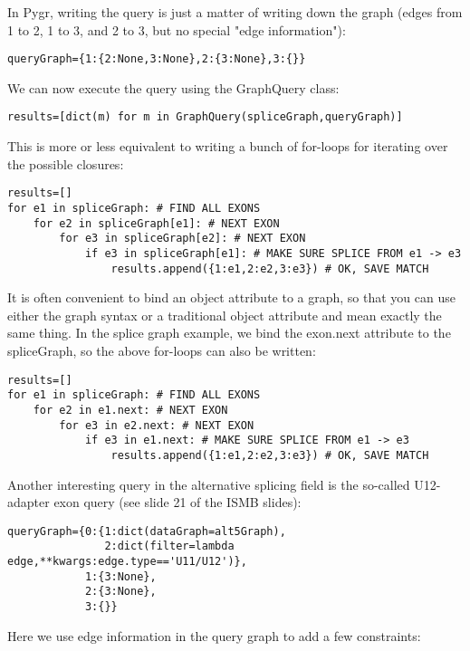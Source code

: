 \documentclass{howto}
\begin{document}
In Pygr, writing the query is just a matter of writing down the graph (edges from 1 to 2, 1 to 3, and 2 to 3, but no special "edge information"):

\begin{verbatim}
queryGraph={1:{2:None,3:None},2:{3:None},3:{}}
\end{verbatim}

We can now execute the query using the GraphQuery class:

\begin{verbatim}
results=[dict(m) for m in GraphQuery(spliceGraph,queryGraph)]
\end{verbatim}

This is more or less equivalent to writing a bunch of for-loops for iterating over the possible closures:

\begin{verbatim}
results=[]
for e1 in spliceGraph: # FIND ALL EXONS
    for e2 in spliceGraph[e1]: # NEXT EXON
        for e3 in spliceGraph[e2]: # NEXT EXON
            if e3 in spliceGraph[e1]: # MAKE SURE SPLICE FROM e1 -> e3
                results.append({1:e1,2:e2,3:e3}) # OK, SAVE MATCH
\end{verbatim}

It is often convenient to bind an object attribute to a graph, so that you can use either the graph syntax or a traditional object attribute and mean exactly the same thing.  In the splice graph example, we bind the exon.next attribute to the spliceGraph, so the above for-loops can also be written:

\begin{verbatim}
results=[]
for e1 in spliceGraph: # FIND ALL EXONS
    for e2 in e1.next: # NEXT EXON
        for e3 in e2.next: # NEXT EXON
            if e3 in e1.next: # MAKE SURE SPLICE FROM e1 -> e3
                results.append({1:e1,2:e2,3:e3}) # OK, SAVE MATCH
\end{verbatim}

Another interesting query in the alternative splicing field is the so-called U12-adapter exon query (see slide 21 of the ISMB slides):

\begin{verbatim}
queryGraph={0:{1:dict(dataGraph=alt5Graph),
               2:dict(filter=lambda edge,**kwargs:edge.type=='U11/U12')},
            1:{3:None},
            2:{3:None},
            3:{}}
\end{verbatim}

Here we use edge information in the query graph to add a few constraints:
\end{document}
